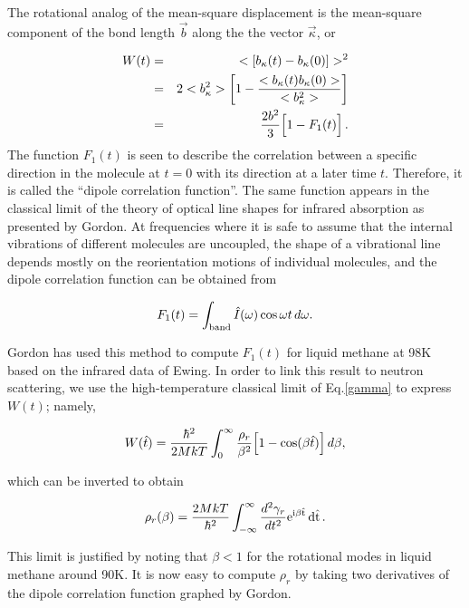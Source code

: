 \noindent
The rotational analog of the mean-square displacement is the mean-square
component of the bond length $\vec{b}$ along the the vector $\vec{\kappa}$, or

\begin{eqnarray}
   W(t)&=&<[b_\kappa(t)-b_\kappa(0)]>^2\nonumber\\
       &=&2<b_\kappa^2>\left[1-\frac{<b_\kappa(t)
            b_\kappa(0)>}{<b_\kappa^2>}\right]\nonumber\\
       &=&\frac{2b^2}{3}\Bigl[1-F_1(t)\Bigr]\,.
\end{eqnarray}
The function $F_1(t)$  is seen to describe the correlation between a
specific direction in the molecule at $t{=}0$ with its direction at a later
time $t$.  Therefore, it is called the ``dipole correlation function''.
The same function appears in the classical limit of the theory of
optical line shapes for infrared absorption as presented by
Gordon\cite{Gordon}.  At frequencies where it is safe to assume that
the internal vibrations of different molecules are uncoupled, the shape
of a vibrational line depends mostly on the reorientation motions of
individual molecules, and the dipole correlation function can be
obtained from

\begin{equation}
   F_1(t)=\int_{\rm band}\hat{I}(\omega)\cos\omega t\,d\omega.
\end{equation}

\noindent
Gordon has used this method to compute $F_1(t)$ for liquid methane at
98K based on the infrared data of Ewing\cite{Ewing}.  In order to link this
result to neutron scattering, we use the high-temperature classical limit
of Eq.\ref{gamma} to express $W(t)$; namely,

\begin{equation}
   W(\hat{t})=\frac{\hbar^2}{2MkT}\int_0^\infty
      \frac{\rho_r}{\beta^2}\Bigl[1-\cos(\beta\hat{t})\Bigr]\,d\beta,
\end{equation}
\vspace{0.5 pt}

\noindent
which can be inverted to obtain

\begin{equation}
   \rho_r(\beta)=\frac{2MkT}{\hbar^2}\int_{-\infty}^\infty
       \frac{d^2\gamma_r}{dt^2}\rm e^{i\beta\hat{t}}\,d\hat{t}\,.
\end{equation}

\noindent
This limit is justified by noting that $\beta{<}1$ for the rotational modes
in liquid methane around 90K.  It is now easy to compute $\rho_r$ by taking
two derivatives of the dipole correlation function graphed by Gordon.

